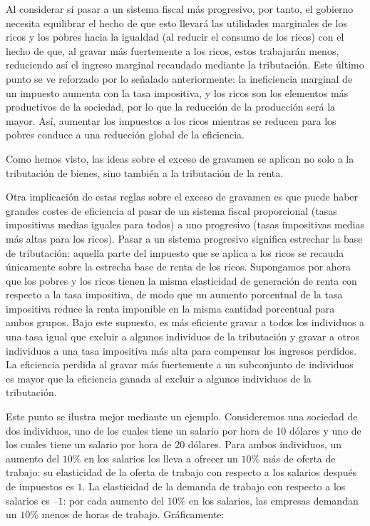 \documentclass[10pt,a4paper]{article}
\begin{document}
Al considerar si pasar a un sistema fiscal más progresivo, por tanto, el gobierno necesita equilibrar el hecho de que esto llevará las utilidades marginales de los ricos y los pobres hacia la igualdad (al reducir el consumo de los ricos) con el hecho de que, al gravar más fuertemente a los ricos, estos trabajarán menos, reduciendo así el ingreso marginal recaudado mediante la tributación. Este último punto se ve reforzado por lo señalado anteriormente: la ineficiencia marginal de un impuesto aumenta con la tasa impositiva, y los ricos son los elementos más productivos de la sociedad, por lo que la reducción de la producción será la mayor. Así, aumentar los impuestos a los ricos mientras se reducen para los pobres conduce a una reducción global de la eficiencia.

Como hemos visto, las ideas sobre el exceso de gravamen se aplican no solo a la tributación de bienes, sino también a la tributación de la renta. 

Otra implicación de estas reglas sobre el exceso de gravamen es que puede haber grandes costes de eficiencia al pasar de un sistema fiscal proporcional (tasas impositivas medias iguales para todos) a uno progresivo (tasas impositivas medias más altas para los ricos). Pasar a un sistema progresivo significa estrechar la base de tributación: aquella parte del impuesto que se aplica a los ricos se recauda únicamente sobre la estrecha base de renta de los ricos. Supongamos por ahora que los pobres y los ricos tienen la misma elasticidad de generación de renta con respecto a la tasa impositiva, de modo que un aumento porcentual de la tasa impositiva reduce la renta imponible en la misma cantidad porcentual para ambos grupos. Bajo este supuesto, es más eficiente gravar a todos los individuos a una tasa igual que excluir a algunos individuos de la tributación y gravar a otros individuos a una tasa impositiva más alta para compensar los ingresos perdidos. La eficiencia perdida al gravar más fuertemente a un subconjunto de individuos es mayor que la eficiencia ganada al excluir a algunos individuos de la tributación.

Este punto se ilustra mejor mediante un ejemplo. Consideremos una sociedad de dos individuos, uno de los cuales tiene un salario por hora de 10 dólares y uno de los cuales tiene un salario por hora de 20 dólares. Para ambos individuos, un aumento del $10\%$ en los salarios los lleva a ofrecer un $10\%$ más de oferta de trabajo: su elasticidad de la oferta de trabajo con respecto a los salarios después de impuestos es $1$. La elasticidad de la demanda de trabajo con respecto a los salarios es $–1$: por cada aumento del $10\%$ en los salarios, las empresas demandan un $10\%$ menos de horas de trabajo. Gráficamente:
\end{document}
